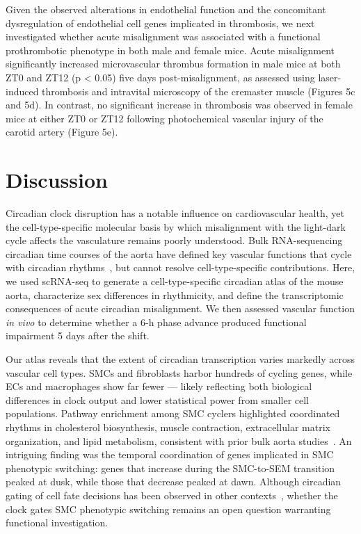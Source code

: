 \documentclass[12pt]{article}
\begin{document}
Given the observed alterations in endothelial function and the concomitant dysregulation of endothelial cell genes implicated in thrombosis, we next investigated whether acute misalignment was associated with a functional prothrombotic phenotype in both male and female mice.
Acute misalignment significantly increased microvascular thrombus formation in male mice at both ZT0 and ZT12 (p < 0.05) five days post-misalignment, as assessed using laser-induced thrombosis and intravital microscopy of the cremaster muscle (Figures 5c and 5d).
In contrast, no significant increase in thrombosis was observed in female mice at either ZT0 or ZT12 following photochemical vascular injury of the carotid artery (Figure 5e).

\section*{Discussion}

Circadian clock disruption has a notable influence on cardiovascular health, yet the
cell-type-specific molecular basis by which misalignment with the light-dark cycle affects the
vasculature remains poorly understood. Bulk RNA-sequencing circadian time courses of the aorta have
defined key vascular functions that cycle with circadian rhythms~\cite{ref41}, but cannot resolve
cell-type-specific contributions. Here, we used scRNA-seq to generate a cell-type-specific circadian
atlas of the mouse aorta, characterize sex differences in rhythmicity, and define the transcriptomic
consequences of acute circadian misalignment.
We then assessed vascular function \textit{in vivo} to determine whether a 6-h phase advance produced functional impairment 5 days after the shift.

Our atlas reveals that the extent of circadian transcription varies markedly across vascular cell
types. SMCs and fibroblasts harbor hundreds of cycling genes, while ECs and macrophages
show far fewer --- likely reflecting both biological differences in clock output and lower
statistical power from smaller cell populations. Pathway enrichment among SMC cyclers highlighted
coordinated rhythms in cholesterol biosynthesis, muscle contraction, extracellular matrix
organization, and lipid metabolism, consistent with prior bulk aorta
studies~\cite{ref41,ref42,ref43}. An intriguing finding was the temporal coordination of genes
implicated in SMC phenotypic switching: genes that increase during the SMC-to-SEM transition peaked
at dusk, while those that decrease peaked at dawn. Although circadian gating of cell fate decisions
has been observed in other contexts~\cite{ref69,ref70,ref71}, whether the clock gates SMC phenotypic
switching remains an open question warranting functional investigation.
\end{document}
